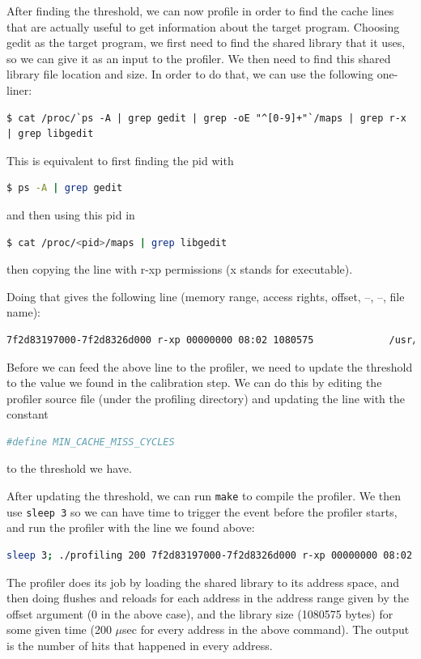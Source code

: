 After finding the threshold, we can now profile in order to find the cache lines
that are actually useful to get information about the target program. Choosing
gedit as the target program, we first need to find the shared library that it
uses, so we can give it as an input to the profiler. We then need to find this
shared library file location and size. In order to do that, we can use the
following one-liner:
\begin{lstlisting}
$ cat /proc/`ps -A | grep gedit | grep -oE "^[0-9]+"`/maps | grep r-x | grep libgedit
\end{lstlisting}
This is equivalent to first finding the pid with
\begin{lstlisting}[language=bash]
  $ ps -A | grep gedit
\end{lstlisting}
and then using this pid in
\begin{lstlisting}[language=bash]
  $ cat /proc/<pid>/maps | grep libgedit
\end{lstlisting}
then copying the line with r-xp permissions (x stands for executable).

Doing that gives the following line (memory range, access rights, offset, –, –,
file name):

\begin{lstlisting}[language=bash]
7f2d83197000-7f2d8326d000 r-xp 00000000 08:02 1080575             /usr/lib/gedit/libgedit.so
\end{lstlisting}

Before we can feed the above line to the profiler, we need to update the
threshold to the value we found in the calibration step. We can do this by
editing the profiler source file (under the profiling directory) and updating
the line with the constant 
\begin{lstlisting}[language=bash]
#define MIN_CACHE_MISS_CYCLES
\end{lstlisting}
to the threshold we have.

After updating the threshold, we can run \texttt{make} to compile the profiler.
We then use \texttt{sleep 3} so we can have time to trigger the event before the
profiler starts, and run the profiler with the line we found above: 
\begin{lstlisting}[language=bash]
sleep 3; ./profiling 200 7f2d83197000-7f2d8326d000 r-xp 00000000 08:02 1080575                    /usr/lib/gedit/libgedit.so
\end{lstlisting}

The profiler does its job by loading the shared library to its address space,
and then doing flushes and reloads for each address in the address range given
by the offset argument (0 in the above case), and the library size (1080575
bytes) for some given time (200 $\mu$sec for every address in the above
command). The output is the number of hits that happened in every address.

